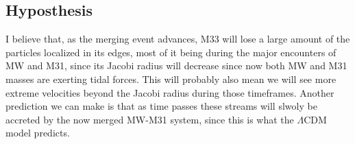 \documentclass[linenumbers,trackchanges]{aastex7}
\begin{document}
\subsection{Hyposthesis}

I believe that, as the merging event advances, M33 will lose a large amount of the particles localized in its edges, most of it being during the major encounters of MW and M31, since its Jacobi radius will decrease since now both MW and M31 masses are exerting tidal forces. This will probably also mean we will see more extreme velocities beyond the Jacobi radius during those timeframes. Another prediction we can make is that as time passes these streams will slwoly be accreted by the now merged MW-M31 system, since this is what the $\Lambda$CDM model predicts.


{}



\end{document}
